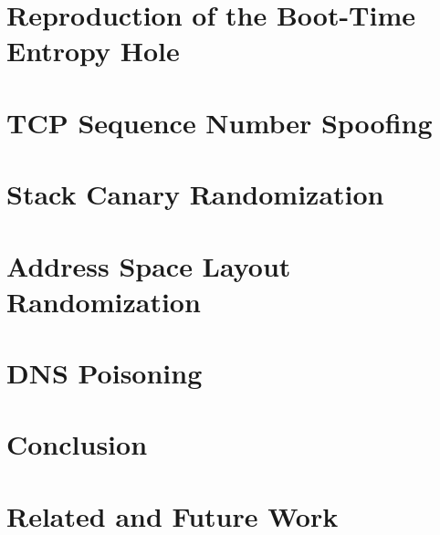 \section{Reproduction of the Boot-Time Entropy Hole}


\section{TCP Sequence Number Spoofing}


\section{Stack Canary Randomization}


\section{Address Space Layout Randomization}


\section{DNS Poisoning}


\section{Conclusion}


\section{Related and Future Work}


{
  \footnotesize
  
  
}


